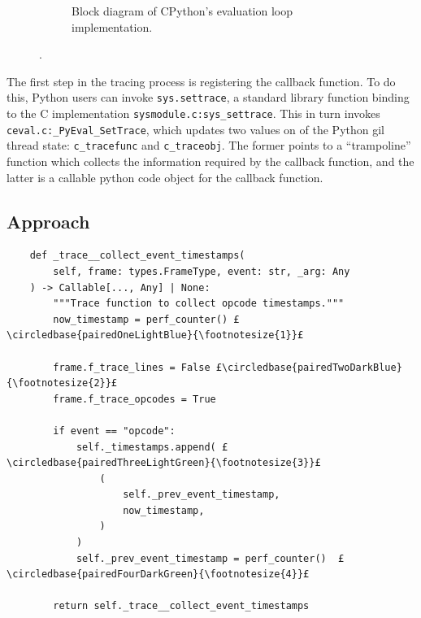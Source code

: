 \begin{figure}[H]
\begin{subfigure}[b]{0.3\textwidth}
       \caption{Block diagram of CPython's evaluation loop implementation.}
       \label{figure:cpython-evaluation-overview-block}
    \end{subfigure}
    \vspace{1em}
    \captionsetup{name=Listing}
    \caption{.}
    \label{figure:cpython-evaluation-overview}
\end{figure}


The first step in the tracing process is registering the callback function.
To do this, Python users can invoke \texttt{sys.settrace}, a standard library function binding to the C implementation \texttt{sysmodule.c:sys\_settrace}. This in turn invokes \texttt{ceval.c:\_PyEval\_SetTrace}, which updates two values on of the Python \ac{gil} thread state: \texttt{c\_tracefunc} and \texttt{c\_traceobj}. The former points to a ``trampoline'' function which collects the information required by the callback function, and the latter is a callable python code object for the callback function.


\subsection{Approach}
\label{ssec:profiling-bytecode-approach}



\begin{code}
    \centering
    \begin{verbatim}
    def _trace__collect_event_timestamps(
        self, frame: types.FrameType, event: str, _arg: Any
    ) -> Callable[..., Any] | None:
        """Trace function to collect opcode timestamps."""
        now_timestamp = perf_counter() £\circledbase{pairedOneLightBlue}{\footnotesize{1}}£

        frame.f_trace_lines = False £\circledbase{pairedTwoDarkBlue}{\footnotesize{2}}£
        frame.f_trace_opcodes = True

        if event == "opcode":
            self._timestamps.append( £\circledbase{pairedThreeLightGreen}{\footnotesize{3}}£
                (
                    self._prev_event_timestamp,
                    now_timestamp,
                )
            )
            self._prev_event_timestamp = perf_counter()  £\circledbase{pairedFourDarkGreen}{\footnotesize{4}}£

        return self._trace__collect_event_timestamps
    \end{verbatim}
    \caption{.}
    \label{listing:profiling-trace-function}
\end{code}

